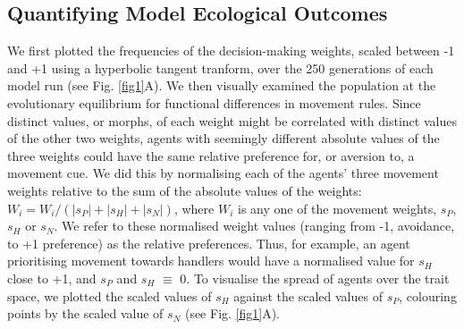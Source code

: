     
    \subsection*{Quantifying Model Ecological Outcomes}
    
    We first plotted the frequencies of the decision-making weights, scaled between -1 and +1 using a hyperbolic tangent tranform, over the 250 generations of each model run (see Fig. \ref{fig1}A).
    We then visually examined the population at the evolutionary equilibrium for functional differences in movement rules.
    Since distinct values, or morphs, of each weight might be correlated with distinct values of the other two weights, agents with seemingly different absolute values of the three weights could have the same relative preference for, or aversion to, a movement cue.
    We did this by normalising each of the agents' three movement weights relative to the sum of the absolute values of the weights:
    $W_i = W_i / (|s_P| + |s_H| + |s_N|)$, where $W_i$ is any one of the movement weights, $s_P$, $s_H$ or $s_N$.
    We refer to these normalised weight values (ranging from -1, avoidance, to +1 preference) as the relative preferences.
    Thus, for example, an agent prioritising movement towards handlers would have a normalised value for $s_H$ close to +1, and $s_P$ and $s_H$ $\equiv$ 0.
    To visualise the spread of agents over the trait space, we plotted the scaled values of $s_H$ against the scaled values of $s_P$, colouring points by the scaled value of $s_N$ (see Fig. \ref{fig1}A).
        
